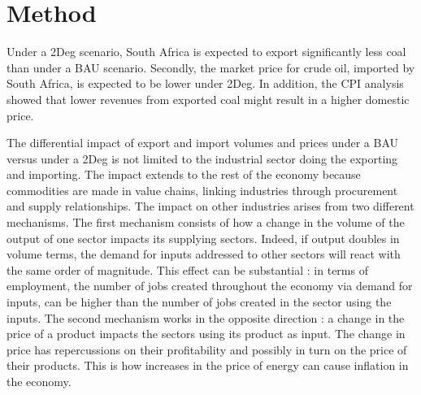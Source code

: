 \documentclass[12pt,english]{article}
\begin{document}
\section{Method}

Under a 2Deg scenario, South Africa is expected to export significantly less coal than under a BAU scenario. Secondly, the market price for crude oil, imported by South Africa, is expected to be lower under 2Deg. In addition, the CPI analysis showed that lower revenues from exported coal might result in a higher domestic price. %


The differential impact of export and import volumes and prices under a BAU versus under a 2Deg is not limited to the industrial sector doing the exporting and importing. The impact extends to the rest of the economy because commodities are made in value chains, linking industries through procurement and supply relationships. The impact on other industries arises from two different mechanisms. The first mechanism consists of how a change in the volume of the output of one sector impacts its supplying sectors. Indeed, if output doubles in volume terms, the demand for inputs addressed to other sectors will react with the same order of magnitude. This effect can be substantial : in terms of employment, the number of jobs created throughout the economy via demand for inputs, can be higher than the number of jobs created in the sector using the inputs. The second mechanism works in the opposite direction : a change in the price of a product impacts the sectors using its product as input. The change in price has repercussions on their profitability and possibly in turn on the price of their products. This is how increases in the price of energy can cause inflation in the economy.

\end{document}
